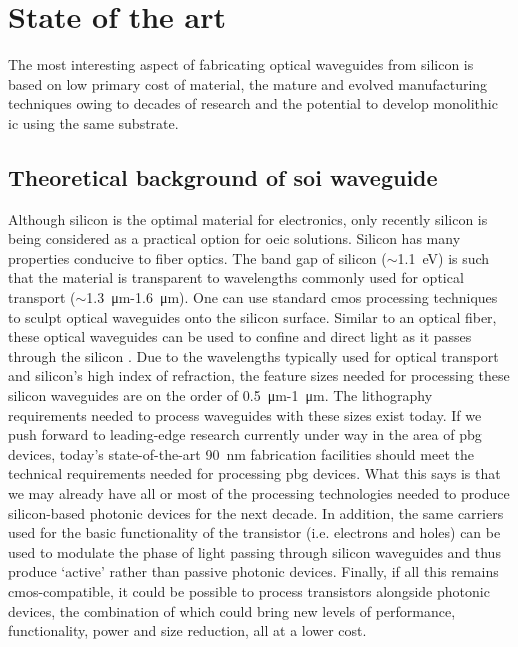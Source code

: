 \documentclass[../report.tex]{subfiles}
\begin{document}
	
	
\chapter{State of the art}
The most interesting aspect of fabricating optical waveguides from silicon is based on low primary cost of material, the mature and evolved manufacturing techniques owing to decades of research and the potential to develop monolithic \gls{ic} using the same substrate.

	\section{Theoretical background of \gls{soi} waveguide}
Although silicon is the optimal material for electronics, only recently silicon is being considered as a practical option for \gls{oeic} solutions. Silicon has many properties conducive to fiber optics. The band gap of silicon ($\sim$\SI{1.1}{\electronvolt}) is such that the material is transparent to wavelengths commonly used for optical transport ($\sim$\SI{1.3}{\micro\metre}-\SI{1.6}{\micro\metre}). One can use standard \gls{cmos} processing techniques to sculpt optical waveguides onto the silicon surface. Similar to an optical fiber, these optical waveguides can be used to confine and direct light as it passes through the silicon \cite{reed_silicon_2004}. Due to the wavelengths typically used for optical transport and silicon’s high index of refraction, the feature sizes needed for processing these silicon waveguides are on the order of \SI{0.5}{\micro\metre}-\SI{1}{\micro\metre}. The lithography requirements needed to process waveguides with these sizes exist today. If we push forward to leading-edge research currently under way in the area of \gls{pbg} devices, today’s state-of-the-art \SI{90}{\nano\metre} fabrication facilities should meet the technical requirements needed for processing \gls{pbg} devices. What this says is that we may already have all or most of the processing technologies needed to produce silicon-based photonic devices for the next decade. In addition, the same carriers used for the basic functionality of the transistor (i.e. electrons and holes) can be used to modulate the phase of light passing through silicon waveguides and thus produce ‘active’ rather than passive photonic devices. Finally, if all this remains \gls{cmos}-compatible, it could be possible to process transistors alongside photonic devices, the combination of which could bring new levels of performance, functionality, power and size reduction, all at a lower cost.
		
\end{document}
